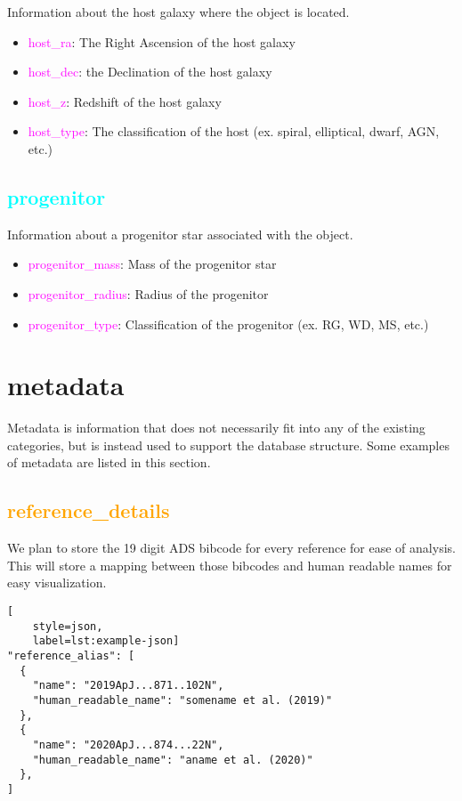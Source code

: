 \documentclass[tighten]{aastex631}
\newcommand{\property}[1]{\textcolor{cyan}{#1}}
\newcommand{\element}[1]{\textcolor{orange}{#1}}
\newcommand{\keyword}[1]{\textcolor{magenta}{#1}}
\begin{document}
Information about the host galaxy where the object is located.
\begin{itemize}
    \item \keyword{host\_ra}: The Right Ascension of the host galaxy
    \item \keyword{host\_dec}: the Declination of the host galaxy
    \item \keyword{host\_z}: Redshift of the host galaxy
    \item \keyword{host\_type}: The classification of the host (ex. spiral, elliptical, dwarf, AGN, etc.)
\end{itemize}

\subsection{\property{progenitor}} \label{sec:progenitor}

Information about a progenitor star associated with the object.
\begin{itemize}
    \item \keyword{progenitor\_mass}: Mass of the progenitor star
    \item \keyword{progenitor\_radius}: Radius of the progenitor
    \item \keyword{progenitor\_type}: Classification of the progenitor (ex. RG, WD, MS, etc.)
\end{itemize}

\section{metadata} \label{sec:metadata}

Metadata is information that does not necessarily fit into any of the existing categories, but is instead used to support the database structure. Some examples of metadata are listed in this section.

\subsection{\element{reference\_details}} \label{sec:reference_details}

We plan to store the 19 digit ADS bibcode for every reference for ease of analysis. This will store a mapping between those bibcodes and human readable names for easy visualization.

\begin{lstlisting}[
    style=json,
    label=lst:example-json]
"reference_alias": [
  {
    "name": "2019ApJ...871..102N",
    "human_readable_name": "somename et al. (2019)"
  },
  {
    "name": "2020ApJ...874...22N",
    "human_readable_name": "aname et al. (2020)"
  },
]
\end{lstlisting}
\end{document}

